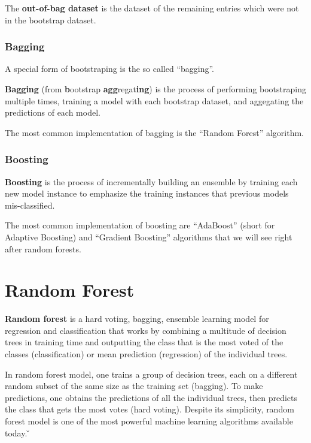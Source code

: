The \textbf{out-of-bag dataset} is the dataset of the remaining entries which were not in the bootstrap dataset.
\ed


\subsubsection{Bagging}

A special form of bootstraping is the so called ``bagging''.

\bd[Bagging]
\textbf{Bagging} (from \textbf{b}ootstrap \textbf{agg}regat\textbf{ing}) is the process of performing bootstraping
multiple times, training a model with each bootstrap dataset, and aggegating the predictions of each model.
\ed


The most common implementation of bagging is the ``Random Forest'' algorithm.

\subsubsection{Boosting}

\bd[Boosting]
\textbf{Boosting} is the process of incrementally building an ensemble by training each new model instance to emphasize
the training instances that previous models mis-classified.
\ed


The most common implementation of boosting are ``AdaBoost'' (short for Adaptive  Boosting) and ``Gradient Boosting''
algorithms that we will see right after random forests.

\section{Random Forest}

\textbf{Random forest} is a hard voting, bagging, ensemble learning model for regression and classification that works
by combining a multitude of decision trees in training time and outputting the class that is the most voted of the
classes (classification) or mean prediction (regression) of the individual trees.
\ed

In random forest model, one trains a group of decision trees, each on a different random subset of the same size as
the training set (bagging). To make predictions, one obtains the predictions of all the individual trees, then
predicts the class that gets the most votes (hard voting). Despite its simplicity, random forest model is one of the
most powerful machine learning algorithms available today. \v

